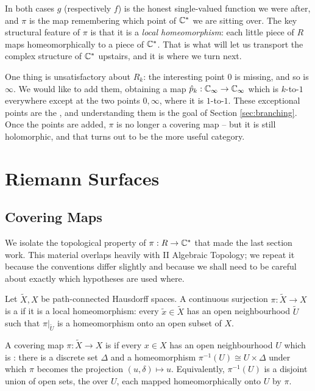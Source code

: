 \documentclass[a4paper]{scrartcl}
\newcommand{\Cinf}{\C_\infty}
\newcommand{\Cs}{\C^*}
\begin{document}
In both cases $g$ (respectively $f$) is the honest single-valued function we were after,
and $\pi$ is the map remembering which point of $\Cs$ we are sitting over. The key
structural feature of $\pi$ is that it is a \emph{local homeomorphism}: each little piece
of $R$ maps homeomorphically to a piece of $\Cs$. That is what will let us transport the
complex structure of $\Cs$ upstairs, and it is where we turn next.

\begin{remark}
	One thing is unsatisfactory about $R_k$: the interesting point $0$ is missing, and so
	is $\infty$. We would like to add them, obtaining a map
	$\hat{p}_k : \Cinf \to \Cinf$ which is $k$-to-$1$ everywhere except at the two points
	$0, \infty$, where it is $1$-to-$1$. These exceptional points are the , and understanding them is the goal of Section \ref{sec:branching}. Once the
	points are added, $\pi$ is no longer a covering map -- but it is still holomorphic, and
	that turns out to be the more useful category.
\end{remark}

\section{Riemann Surfaces}

\subsection{Covering Maps}

We isolate the topological property of $\pi : R \to \Cs$ that made the last section work.
This material overlaps heavily with II Algebraic Topology; we repeat it because the
conventions differ slightly and because we shall need to be careful about exactly which
hypotheses are used where.

\begin{definition}
	Let $\tilde X, X$ be path-connected Hausdorff spaces. A continuous surjection
	$\pi : \tilde X \to X$ is a  if it is a local homeomorphism: every
	$\tilde x \in \tilde X$ has an open neighbourhood $\tilde U$ such that $\pi|_{\tilde U}$
	is a homeomorphism onto an open subset of $X$.
\end{definition}

\begin{definition}
	A covering map $\pi : \tilde X \to X$ is  if every $x \in X$ has an open
	neighbourhood $U$ which is : there is a discrete set $\Delta$ and
	a homeomorphism $\pi^{-1}(U) \cong U \times \Delta$ under which $\pi$ becomes the
	projection $(u, \delta) \mapsto u$. Equivalently, $\pi^{-1}(U)$ is a disjoint union of
	open sets, the  over $U$, each mapped homeomorphically onto $U$ by $\pi$.
\end{definition}
\end{document}
